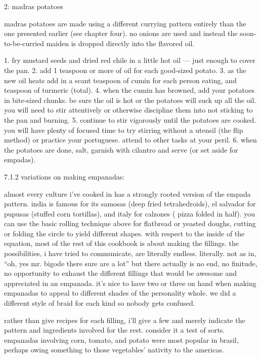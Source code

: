 2: madras potatoes

	madras potatoes are made using a different currying pattern entirely than the one presented earlier (see chapter four). no onions are used and instead the soon-to-be-curried maiden is dropped directly into the flavored oil.

1.	fry mustard seeds and dried red chile in a little hot oil --- just enough to cover the pan.
2.	add 1 teaspoon or more of oil for each good-sized potato.
3.	as the new oil heats add in a scant teaspoon of cumin for each person eating, and \onehalf teaspoon of turmeric (total).
4.	when the cumin has browned, add your potatoes in bite-sized chunks. be sure the oil is hot or the potatoes will suck up all the oil. you will need to stir attentively or otherwise discipline them into not sticking to the pan and burning.
5.	continue to stir vigorously until the potatoes are cooked. you will have plenty of focused time to try stirring without a utensil (the flip method) or practice your portuguese. attend to other tasks at your peril.
6.	when the potatoes are done, salt, garnish with cilantro and serve (or set aside for empadas).

7.1.2  variations on making empanadas:

almost every culture i've cooked in has a strongly rooted version of the empada pattern. india is famous for its samosas (deep fried tetrahedroids), el salvador for pupusas (stuffed corn tortillas), and italy for calzones ( pizza folded in half). you can use the basic rolling technique above for flatbread or yeasted doughs, cutting or folding the circle to yield different shapes.
with respect to the inside of the equation, most of the rest of this cookbook is about making the fillings. the possibilities, i have tried to communicate, are literally endless. literally. not as in, ``oh, yes mr. bigode there sure are a lot'' but there actually is no end, no finitude, no opportunity to exhaust the different fillings that would be awesome and appreciated in an empanada. it's nice to have two or three on hand when making empanadas to appeal to different shades of the personality whole. we did a different style of braid for each kind so nobody gets confused.

rather than give recipes for each filling, i'll give a few and merely indicate the pattern and ingredients involved for the rest. consider it a test of sorts. empanadas involving corn, tomato, and potato were most popular in brasil, perhaps owing something to those vegetables' nativity to the americas. 

